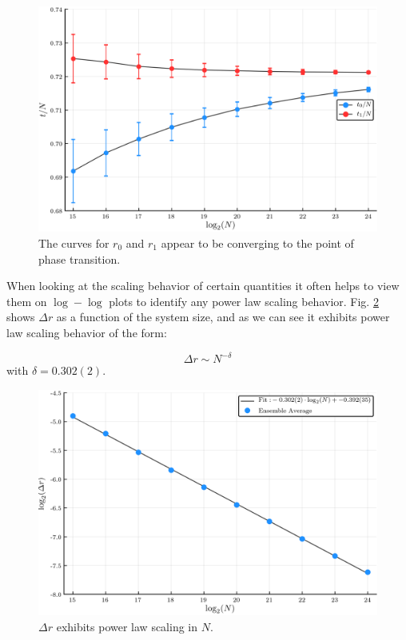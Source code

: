 \begin{figure}[H]
	\centering
	\includegraphics[width=350pt, clip]{images/r_scaling.png}
	\caption{The curves for $r_0$ and $r_1$ appear to be converging to the point of phase transition.}
	\label{fig:r_scaling}
\end{figure}

When looking at the scaling behavior of certain quantities it often helps to view them on $\log-\log$ plots to identify any power law scaling behavior.
Fig. \ref{fig:delta_r_scaling} shows $\Delta r$ as a function of the system size, and as we can see it exhibits power law scaling behavior of the form:

\begin{equation}
	\Delta r \sim N^{-\delta}
\end{equation}
with $\delta = 0.302(2)$.

\begin{figure}[H]
	\centering
	\includegraphics[width=350pt, clip]{images/delta_r_scaling.png}
	\caption{$\Delta r$ exhibits power law scaling in $N$.}
	\label{fig:delta_r_scaling}
\end{figure}

